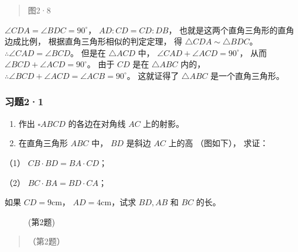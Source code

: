 \begin{quote}
图2·8
\end{quote}

\(\angle CDA = \angle BDC = 90^{\circ}\)， \(AD:CD = CD:DB\)，
也就是这两个直角三角形的直角边成比例， 根据直角三角形相似的判定定理， 得
\(\triangle CDA \sim \triangle BDC\)。
\(\therefore \angle CAD = \angle BCD\)。 但是在 \(\triangle ACD\) 中，
\(\angle CAD + \angle ACD = 90^{\circ}\)， 从而
\(\angle BCD + \angle ACD = 90^{\circ}\)。 由于 \(CD\) 是在
\(\triangle ABC\) 内的，
\(\therefore \angle BCD + \angle ACD = \angle ACB = 90^{\circ}\)。
这就证得了 \(\triangle ABC\) 是一个直角三角形。

\subsubsection{习题2·1}

\begin{enumerate}
\item
  作出 \(\square ABCD\) 的各边在对角线 \(AC\) 上的射影。
\item
  在直角三角形 \(ABC\) 中， \(BD\) 是斜边 \(AC\) 上的高 （图如下），
  求证：
\end{enumerate}

（1） \(CB \cdot BD = BA \cdot CD\)；

（2） \(BC \cdot BA = BD \cdot CA\)；

如果 \(CD = 9\mathrm{cm}\)， \(AD = 4\mathrm{cm}\)，试求 \(BD, AB\) 和
\(BC\) 的长。

\begin{figure}
\centering
{}
\caption{(第2题)}
\end{figure}

\begin{quote}
（第2题）
\end{quote}

